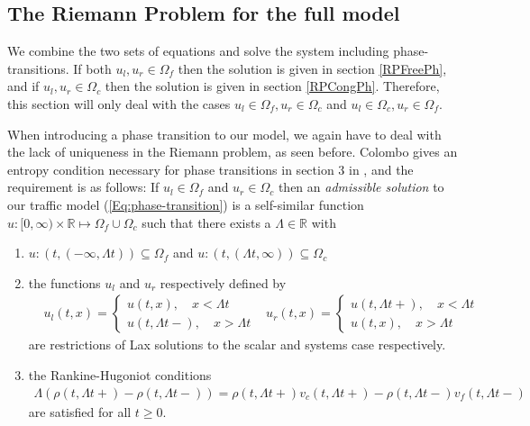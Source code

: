 \documentclass[10pt]{article}
\numberwithin{equation}{section}
\begin{document}
\newpage

\subsection{The Riemann Problem for the full model}
We combine the two sets of equations and solve the system including phase-transitions. If both $u_l, u_r \in \Omega_f$ then the solution is given in section \ref{RPFreePh}, and if $u_l, u_r \in \Omega_c$ then the solution is given in section \ref{RPCongPh}. Therefore, this section will only deal with the cases $u_l \in \Omega_f, u_r \in \Omega_c$ and $u_l \in \Omega_c, u_r \in \Omega_f$.

When introducing a phase transition to our model, we again have to deal with the lack of uniqueness in the Riemann problem, as seen before. Colombo gives an entropy condition necessary for phase transitions in section 3 in \cite{Colombo2003}, and the requirement is as follows: If $u_l \in \Omega_f$ and $u_r \in \Omega_c$ then an \textit{admissible solution} to our traffic model (\ref{Eq:phase-transition}) is a self-similar function $u:[0, \infty) \times \mathbb{R} \mapsto \Omega_f \cup \Omega_c$ such that there exists a $\Lambda \in \mathbb{R}$ with 
\begin{enumerate}[label=\textit{\roman*)}]
    \item $u:(t, (-\infty,\Lambda t)) \subseteq \Omega_f $ and $u:(t, (\Lambda t, \infty)) \subseteq \Omega_c $ 
    \item the functions $u_l$ and $u_r$ respectively defined by \begin{align*}
        & u_l(t,x) = \begin{cases}
        u(t,x),  \quad x < \Lambda t\\
        u(t,\Lambda t-),\quad x > \Lambda t
        \end{cases}
        & u_r(t,x) = \begin{cases}
        u(t,\Lambda t+), \quad x < \Lambda t\\
        u(t,x), \quad x > \Lambda t
        \end{cases}
    \end{align*} are restrictions of Lax solutions to the scalar and systems case respectively. 
    \item the Rankine-Hugoniot conditions 
    \begin{align}
        \Lambda (\rho (t,\Lambda t+) - \rho (t,\Lambda t-)) = \rho (t,\Lambda t+) v_c(t,\Lambda t+) - \rho (t,\Lambda t-) v_f(t,\Lambda t-)
        \label{Eq:RH_PhT}
    \end{align} are satisfied for all $t \geq 0$.
\end{enumerate}
\end{document}
